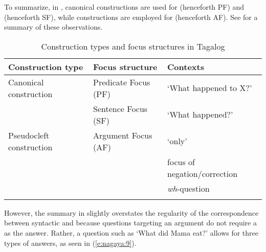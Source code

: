 \documentclass[output=paper]{langsci/langscibook}
\begin{document}
\noindent
To summarize, in , canonical constructions are used for  (henceforth PF) and  (henceforth SF), while  constructions are employed for  (henceforth AF). See  for a summary of these observations.

\begin{table}
\begin{tabularx}{\textwidth}{llQ}
	\lsptoprule
	\textbf{Construction type} & \textbf{Focus structure} & \textbf{Contexts}\\
\midrule 
	{{Canonical construction}} & {Predicate Focus (PF) } & {‘What happened to X?’}\\
	
\tablevspace 	
	& Sentence Focus (SF) & ‘What happened?’\\ 
	
	{{Pseudocleft construction}} & {Argument Focus} (AF)& {‘only’}\\
	{} & {} & {focus of negation/correction}\\
	{}&{}& {\textit{wh}-question}\\
\lspbottomrule
\end{tabularx}
\caption{Construction types and focus structures in Tagalog}
\label{tab:nagaya:1}
\end{table}

\noindent
However, the summary in  slightly overstates the regularity of the correspondence between syntactic and  because questions targeting an argument do not require a  as the answer. Rather, a question such as ‘What did Mama eat?’ allows for three types of answers, as seen in (\ref{e:nagaya:9}).
\end{document}
